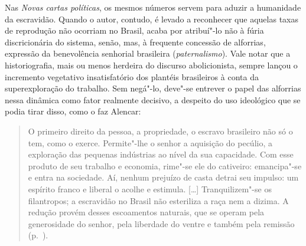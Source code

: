 Nas \textit{Novas cartas políticas}, os mesmos números servem para
aduzir a humanidade da escravidão. Quando o autor, contudo, é levado a reconhecer
que aquelas taxas de reprodução não ocorriam no Brasil, acaba por 
atribuí"-lo não à fúria discricionária do sistema, 
senão, mas, à  frequente concessão de alforrias, expressão da benevolência 
senhorial brasileira (\textit{paternalismo}). Vale notar
que a historiografia, mais ou menos herdeira do discurso abolicionista,
sempre lançou o incremento vegetativo insatisfatório dos plantéis
brasileiros à  conta da superexploração do trabalho. Sem negá"-lo,
deve"-se entrever o papel das alforrias nessa dinâmica como fator
realmente decisivo, a despeito do uso ideológico que se podia tirar
disso, como o faz Alencar: 

\begin{quote}
O primeiro direito da pessoa, a propriedade, o escravo brasileiro não
só o tem, como o exerce. Permite"-lhe o senhor a aquisição do pecúlio,
a exploração das pequenas indústrias ao nível da sua capacidade. Com
esse produto de seu trabalho e economia, rime"-se ele do cativeiro:
emancipa"-se e entra na sociedade. Aí, nenhum prejuízo de casta detrai
seu impulso: um espírito franco e liberal o acolhe e estimula.
[\ldots]
Tranquilizem"-se os filantropos; a escravidão no Brasil não esteriliza
a raça nem a dizima. A redução provém desses escoamentos naturais, que
se operam pela generosidade do senhor, pela liberdade do ventre e
também pela remissão (p.~\pageref{filantropo}). 
\end{quote}

